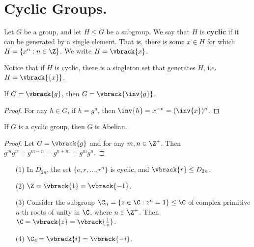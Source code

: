 
\section{Cyclic Groups.}
\label{section1}

\begin{definition}
    Let $G$ be a group, and let  $H \leq G$ be a subgroup. We say that  $H$ is
     \textbf{cyclic} if it can be generated by a single element. That is, there
     is some $x \in H$ for which  $H=\{x^n : n \in \Z\}$. We write
     $H=\vbrack{x}$.
\end{definition}
\begin{remark}
    Notice that if $H$ is cyclic, there is a singleton set that generates  $H$,
    i.e.  $H=\vbrack{\{x\}}$.
\end{remark}

\begin{lemma}\label{2.3.1}
    If $G=\vbrack{g}$, then $G=\vbrack{\inv{g}}$.
\end{lemma}
\begin{proof}
    For any $h \in G$, if  $h=g^n$, then $\inv{h}=x^{-n}=(\inv{x})^n$.
\end{proof}

\begin{lemma}\label{2.3.2}
    If $G$ is a cyclic group, then  $G$ is Abelian.
\end{lemma}
\begin{proof}
    Let $G=\vbrack{g}$ and for any $m,n \in \Z^+$. Then
    $g^mg^n=g^{m+n}=g^{n+m}=g^mg^n$.
\end{proof}

\begin{example}
    \begin{enumerate}
        \item[(1)] In $D_{2n}$, the set $\{e,r, \dots, r^n\}$ is cyclic, and
            $\vbrack{r} \leq D_{2n}$.

        \item[(2)] $\Z=\vbrack{1}=\vbrack{-1}$.

        \item[(3)] Consider the subgroup $\C_n=\{z \in \C : z^n=1\} \leq \C$ of
            complex primitive $n$-th roots of unity in $\C$, where  $n \in
            \Z^+$. Then  $\C=\vbrack{z}=\vbrack{\frac{1}{z}}$.

        \item[(4)] $\C_4=\vbrack{i}=\vbrack{-i}$.
    \end{enumerate}
\end{example}

